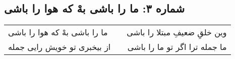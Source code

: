\begin{center}
\section*{شماره ۳: ما را باشی بهْ که هوا را باشی}
\label{sec:003}
\begin{longtable}{l p{0.5cm} r}
ما را باشی بهْ که هوا را باشی
&&
وین خلقِ ضعیفِ مبتلا را باشی
\\
از بیخبری تو خویش رایی جمله
&&
ما جمله ترا اگر تو ما را باشی
\\
\end{longtable}
\end{center}
